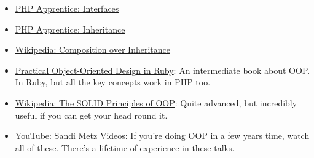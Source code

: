 \begin{itemize}[leftmargin=*]
    \item \href{https://phpapprentice.com/interfaces.html}{PHP Apprentice: Interfaces}
    \item \href{https://phpapprentice.com/classes-inheritance.html}{PHP Apprentice: Inheritance}
    \item \href{https://en.wikipedia.org/wiki/Composition\_over\_inheritance}{Wikipedia: Composition over Inheritance}
    \item \href{https://www.poodr.com}{Practical Object-Oriented Design in Ruby}: An intermediate book about OOP. In Ruby, but all the key concepts work in PHP too.
    \item \href{https://en.wikipedia.org/wiki/SOLID}{Wikipedia: The SOLID Principles of OOP}: Quite advanced, but incredibly useful if you can get your head round it.
    \item \href{https://www.youtube.com/channel/UCk3yOoaVtORwXipuLZ3jWNg}{YouTube: Sandi Metz Videos}: If you're doing OOP in a few years time, watch all of these. There's a lifetime of experience in these talks.
\end{itemize}
